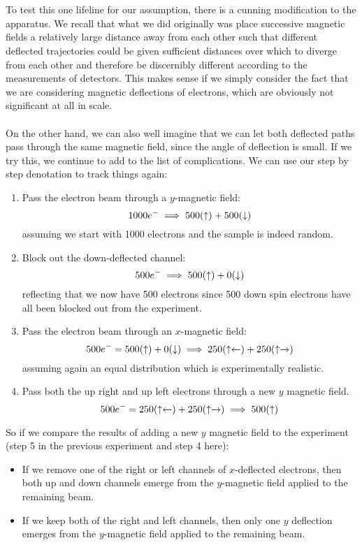 \\\\
To test this one lifeline for our assumption, there is a cunning modification to the apparatus. We recall that what we did originally was place successive magnetic fields a relatively large distance away from each other such that different deflected trajectories could be given sufficient distances over which to diverge from each other and therefore be discernibly different according to the measurements of detectors. This makes sense if we simply consider the fact that we are considering magnetic deflections of electrons, which are obviously not significant at all in scale.
\\\\
On the other hand, we can also well imagine that we can let both deflected paths pass through the same magnetic field, since the angle of deflection is small. If we try this, we continue to add to the list of complications. We can use our step by step denotation to track things again:
\begin{enumerate}
    \item Pass the electron beam through a $y$-magnetic field:
    $$
    1000e^{-} \implies500(\uparrow)+500(\downarrow)
    $$
    assuming we start with 1000 electrons and the sample is indeed random.
    \item Block out the down-deflected channel:
    $$
    500e^{-} \implies500(\uparrow)+0(\downarrow)
    $$
    reflecting that we now have 500 electrons since 500 down spin electrons have all been blocked out from the experiment.
    \item Pass the electron beam through an $x$-magnetic field:
    $$
    500e^{-}=500(\uparrow)+0(\downarrow)\implies250(\uparrow\leftarrow)+250(\uparrow\rightarrow)
    $$
    assuming again an equal distribution which is experimentally realistic.
    \item Pass both the up right and up left electrons through a new $y$ magnetic field.
    $$
    500e^{-}=250(\uparrow\leftarrow)+ 250(\uparrow\rightarrow)\implies 500(\uparrow)
    $$
\end{enumerate}
So if we compare the results of adding a new $y$ magnetic field to the experiment (step 5 in the previous experiment and step 4 here):
\begin{itemize}
    \item If we remove one of the right or left channels of $x$-deflected electrons, then both up and down channels emerge from the $y$-magnetic field applied to the remaining beam.
    \item If we keep both of the right and left channels, then only one $y$ deflection emerges from the $y$-magnetic field applied to the remaining beam.
\end{itemize}
